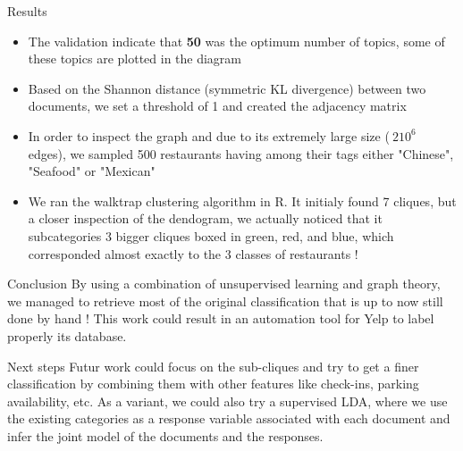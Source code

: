 \documentclass[final]{beamer}
\newlength{\onecolwid}
\begin{document}
\begin{frame}[t]
\begin{columns}[t]
\begin{column}{\onecolwid}

\begin{block}{Results}\vspace{-0.2in}
\small
\begin{itemize}
\item The validation indicate that \textbf{50} was the optimum number of topics, some of these topics are plotted in the diagram 
\item Based on the Shannon distance (symmetric KL divergence) between two documents, we set a threshold of 1 and created the adjacency matrix
\item In order to inspect the graph and due to its extremely large size ($\>2 10^{6}$ edges), we sampled 500 restaurants having among their tags either "Chinese", "Seafood" or "Mexican"
\item We ran the walktrap clustering algorithm in R. It initialy found 7 cliques, but a closer inspection of the dendogram, we actually noticed that it subcategories 3 bigger cliques boxed in green, red, and blue, which corresponded almost exactly to the 3 classes of restaurants !
\end{itemize}


\end{block}
\begin{alertblock}{Conclusion}
\small
By using a combination of unsupervised learning and graph theory, we managed to retrieve most of the original classification that is up to now still done by hand ! This work could result in an automation tool for Yelp to label properly its database. 
\end{alertblock}

\begin{block}{Next steps}\vspace{-0.2in}
\small
Futur work could focus on the sub-cliques and try to get a finer classification by combining them with other features like check-ins, parking availability, etc. As a variant, we could also try a supervised LDA, where we use the existing categories as a response variable associated with each document and infer the joint model of the documents and the responses.
\end{block}



\end{column}
\end{columns}
\end{frame}
\end{document}
